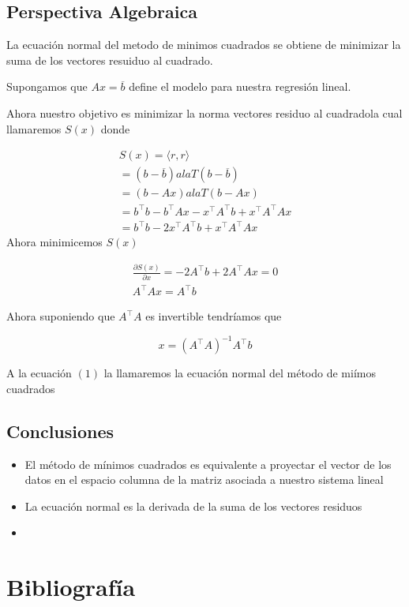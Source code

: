 \documentclass[12pt]{article}
\begin{document}
\vspace{0.5cm}


 
\vspace{6.5cm}
 




\begin{center}    
\section{Perspectiva Algebraica}
\end{center}

 La ecuaci\'on normal del metodo de minimos cuadrados se obtiene de minimizar la suma de los vectores resuiduo al cuadrado.

 Supongamos que $Ax=\overline{b}$ define el modelo para nuestra regresi\'on lineal.

 Ahora nuestro objetivo es minimizar la norma vectores residuo al cuadradola cual llamaremos  $S(x)$ donde

 \begin{align*}
     S(x)=\langle r,r\rangle\\
     =(b-\overline{b})alaT(b-\overline{b})\\
     =(b-Ax)alaT(b-Ax)\\  
     =b^\top b - b^\top Ax - x^\top A^\top b + x^\top A^\top A x\\
     =b^\top b - 2 x^\top A^\top b + x^\top A^\top A x
 \end{align*}
Ahora minimicemos $S(x)$

\begin{align*}
    \frac{\partial S(x)}{\partial x} = -2A^\top b + 2A^\top Ax=0\\
    A^\top Ax = A^\top b
\end{align*}

Ahora suponiendo que $A^\top A$ es invertible tendr\'iamos que

\begin{equation}
    x =(A^\top A)^{-1} A^\top b
\end{equation}
 
A la ecuaci\'on $(1)$ la llamaremos la ecuaci\'on normal del m\'etodo de mi\'imos cuadrados

\begin{center}
\section{Conclusiones}\end{center}
\begin{itemize}
\item El m\'etodo de m\'inimos cuadrados es equivalente a proyectar el vector de los datos en el espacio columna de la matriz asociada a nuestro sistema lineal

\item La ecuaci\'on normal es la derivada de la suma de los vectores residuos

\item 
    
\end{itemize}

\section*{Bibliografía}
\end{document}
